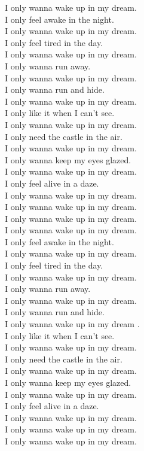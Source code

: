 I only wanna wake up in my dream. \\
I only feel awake in the night. \\
I only wanna wake up in my dream. \\
I only feel tired in the day. \\
I only wanna wake up in my dream. \\
I only wanna run away. \\
I only wanna wake up in my dream. \\
I only wanna run and hide. \\
I only wanna wake up in my dream. \\
I only like it when I can't see. \\
I only wanna wake up in my dream. \\
I only need the castle in the air. \\
I only wanna wake up in my dream. \\
I only wanna keep my eyes glazed. \\
I only wanna wake up in my dream. \\
I only feel alive in a daze. \\
I only wanna wake up in my dream. \\
I only wanna wake up in my dream. \\
I only wanna wake up in my dream. \\

I only wanna wake up in my dream. \\
I only feel awake in the night. \\
I only wanna wake up in my dream. \\
I only feel tired in the day. \\
I only wanna wake up in my dream. \\
I only wanna run away. \\
I only wanna wake up in my dream. \\
I only wanna run and hide. \\
I only wanna wake up in my dream .\\
I only like it when I can't see. \\
I only wanna wake up in my dream. \\
I only need the castle in the air. \\
I only wanna wake up in my dream. \\
I only wanna keep my eyes glazed. \\
I only wanna wake up in my dream. \\
I only feel alive in a daze. \\
I only wanna wake up in my dream. \\
I only wanna wake up in my dream. \\
I only wanna wake up in my dream. \\

